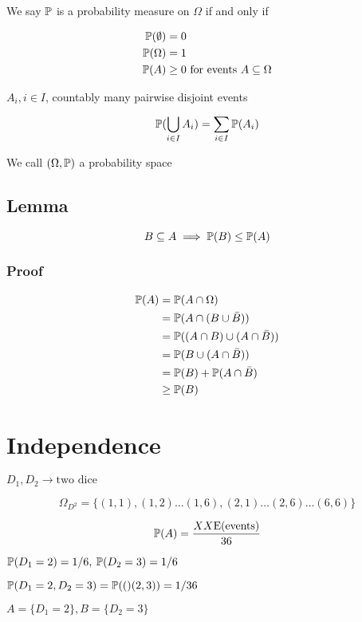 We say $\mathbb{P}$ is a probability measure on $\Omega$ if and only if

\begin{align*}
\mathbb{P}(\emptyset)&=0
\\
\mathbb{P}(\Omega)&=1
\\
\mathbb{P}(A)&\geq 0 \text{ for events }A\subseteq \Omega
\end{align*}

$A_i, i\in I$, countably many pairwise disjoint events

$$
\mathbb{P}(\bigcup_{i\in I}A_i)=\sum_{i\in I}\mathbb{P}(A_i)
$$

We call $(\Omega,\mathbb{P})$ a probability space

\subsection{Lemma}

$$
B\subseteq A\implies \mathbb{P}(B)\leq\mathbb{P}(A)
$$

\subsubsection{Proof}

\begin{align*}
\mathbb{P}(A)
&=\mathbb{P}(A\cap\Omega)
\\
&=\mathbb{P}(A\cap(B\cup \bar{B}))
\\
&=\mathbb{P}((A\cap B)\cup (A\cap \bar{B})    )
\\
&=\mathbb{P}( B\cup (A\cap\bar{B})   )
\\
&=\mathbb{P}(B)+\mathbb{P}(A\cap\bar{B})
\\
&\geq \mathbb{P}(B)
\end{align*}





\section{Independence}

$
D_1, D_2 \rightarrow\text{two dice}
$

$$
\Omega_{D^2}=\{ (1,1), (1,2)\dots (1,6),(2,1)\dots(2,6)\dots(6,6)   \}
$$

$$
\mathbb{P}(A)=\frac{XX\text{E(events)}}{36}
$$

$
\mathbb{P}(D_1=2)=1/6,\: \mathbb{P}(D_2=3)=1/6
$

$
\mathbb{P}(D_1=2,D_2=3)=\mathbb{P}(()(2,3))=1/36
$


$A=\{D_1=2\}, B=\{D_2=3\}$

